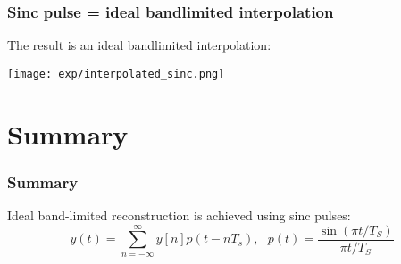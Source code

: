 \documentclass{beamer}
\begin{document}
\begin{frame}
  \frametitle{Sinc pulse = ideal bandlimited interpolation}

  The result is an ideal bandlimited interpolation:

  \centerline{\texttt{[image: exp/interpolated\_sinc.png]}}  
\end{frame}

\section[Summary]{Summary}
\setcounter{subsection}{1}

\begin{frame}
  \frametitle{Summary}


  \vspace*{5mm}
  
  Ideal band-limited reconstruction is achieved using sinc pulses:
  \begin{displaymath}
    y(t) = \sum_{n=-\infty}^\infty y[n]p(t-nT_s),~~~
    p(t) = \frac{\sin(\pi t/T_S)}{\pi t/T_S}
  \end{displaymath}
\end{frame}
\end{document}
